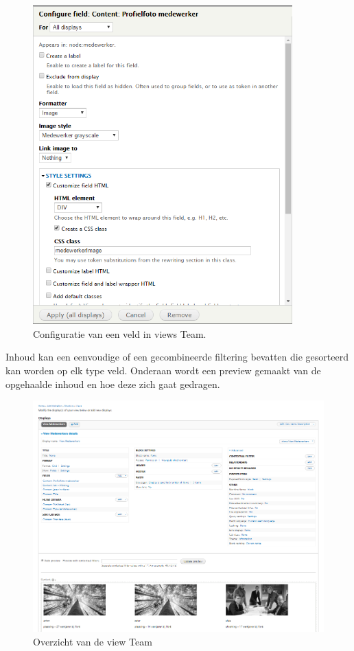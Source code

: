 \begin{figure}[!ht]
  \includegraphics[width=100mm]{img/dr-views-field-setting.png}
  \centering
  \caption{Configuratie van een veld in views Team.}
  \label{fig:Drupal views veld configuratie.}
\end{figure}

\noindent
Inhoud kan een eenvoudige of een gecombineerde filtering bevatten die gesorteerd kan worden op elk type veld. Onderaan wordt een preview gemaakt van de opgehaalde inhoud en hoe deze zich gaat gedragen.

\begin{figure}[!ht]
  \includegraphics[width=\textwidth]{img/dr-views-team.png}
  \centering
  \caption{Overzicht van de view Team}
  \label{fig:Drupal views overzicht configuratie.}
\end{figure}

